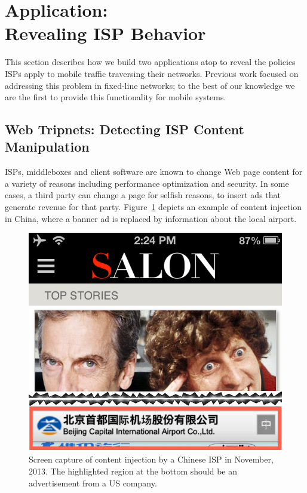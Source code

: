 \section{Application: \\
Revealing ISP Behavior}
\label{sec:isp-behavior}

This section describes how we build two applications atop \meddle to 
reveal the policies ISPs apply to mobile traffic traversing their networks. 
Previous work focused on addressing this problem in fixed-line networks; to 
the best of our knowledge we are the first to provide this functionality for 
mobile systems.

\subsection{Web Tripnets: Detecting ISP Content Manipulation}

ISPs, middleboxes and client software are known to change Web page content for 
a variety of reasons including performance optimization and security. In some cases, 
a third party can change a page for selfish reasons, \eg to insert ads that generate revenue 
for that party. Figure~\ref{fig:tripnet-example} depicts an example of content injection in China, where 
a banner ad is replaced by information about the local airport.

\begin{figure}
\centering
\includegraphics[width=0.9\linewidth]{figures/injectioncrop.png}
\caption{Screen capture of content injection by a Chinese ISP in November, 2013. The 
highlighted region at the bottom should be an advertisement from a US company. }
\vspace{\postfigspace}
\label{fig:tripnet-example}
\end{figure}


